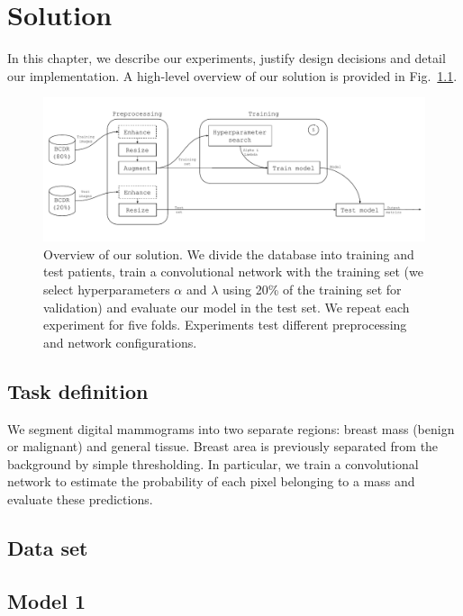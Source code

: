 \chapter{Solution}
\label{ch:Model}

In this chapter, we describe our experiments, justify design decisions and detail our implementation. A high-level overview of our solution is provided in Fig.~\ref{fig:overview}. 
\begin{figure}[ht]
	\centering
	\includegraphics[width=\textwidth]{plots/overview.pdf}
	\caption[Overview of the solution]{Overview of our solution. We divide the database into training and test patients, train a convolutional network with the training set (we select hyperparameters $\alpha$ and $\lambda$ using 20\% of the training set for validation) and evaluate our model in the test set. We repeat each experiment for five folds. Experiments test different preprocessing and network configurations.}
	\label{fig:overview}
\end{figure}

\section{Task definition}
We segment digital mammograms into two separate regions: breast mass (benign or malignant) and general tissue.
Breast area is previously separated from the background by simple thresholding.
In particular, we train a convolutional network to estimate the probability of each pixel belonging to a mass and evaluate these predictions.

\section{Data set}


\section{Model 1}
\label{sec:Model1}


